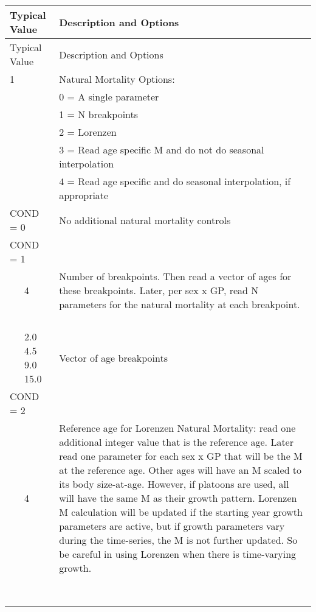 \begin{longtable}{p{0.5cm} p{2cm} p{12.75cm}}

		\multicolumn{2}{l}{Typical Value} & Description and Options\\
		\hline
		\endfirsthead

		\multicolumn{2}{l}{Typical Value} & Description and Options\\
		\hline
		\endhead

		\endfoot

		\endlastfoot

		1 & & Natural Mortality Options:\\
		  & & 0 = A single parameter\\
		  & & 1 = N breakpoints\\
		  & & 2 = Lorenzen \\
		  & & 3 = Read age specific M and do not do seasonal interpolation\\
		  & & \multirow{1}{12cm}[-0.1cm]{4 = Read age specific and do seasonal interpolation, if appropriate}\\
		\hline

	   \multicolumn{2}{l}{COND = 0} & No additional natural mortality controls \\
		\hline
		\multicolumn{2}{l}{COND = 1} & \\
	   & 4 & \multirow{1}{12cm}[-0.1cm]{Number of breakpoints.  Then read a vector of ages for these breakpoints. Later, per sex x GP, read N parameters for the natural mortality at each breakpoint.}
	   \\
	   \\
	   \\
	   \\
	   \\
	   & 2.0 4.5 9.0 15.0 & Vector of age breakpoints \\
	   \hline
	   
	   \multicolumn{2}{l}{COND = 2}& \\
	   & 4 & \multirow{1}{12cm}[-0.1cm]{Reference age for Lorenzen Natural Mortality: read one additional integer value that is the reference age. Later read one parameter for each sex x GP that will be the M at the reference age.  Other ages will have an M scaled to its body size-at-age.  However, if platoons are used, all will have the same M as their growth pattern.  Lorenzen M calculation will be updated if the starting year growth parameters are active, but if growth parameters vary during the time-series, the M is not further updated.  So be careful in using Lorenzen when there is time-varying growth.}\\
	   \\
	   \\
	   \\
	   \\
	   \\
	   \\
	   \\
	   \\
	   \hline
	   

\end{longtable}

